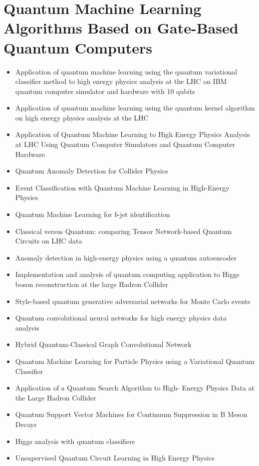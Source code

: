 \section{Quantum Machine Learning Algorithms Based on Gate-Based Quantum Computers}

\begin{itemize}
   \item Application of quantum machine learning using the quantum variational classifier method to high energy physics analysis at the LHC on IBM quantum computer simulator and hardware with 10 qubits~\cite{Wu:2020cye}
   \item Application of quantum machine learning using the quantum kernel algorithm on high energy physics analysis at the LHC~\cite{Wu:2021xsj}
   \item Application of Quantum Machine Learning to High Energy Physics Analysis at LHC Using Quantum Computer Simulators and Quantum Computer Hardware~\cite{Wu:2022tnc}
   \item Quantum Anomaly Detection for Collider Physics~\cite{Alvi:2022fkk}
   \item Event Classification with Quantum Machine Learning in High-Energy Physics~\cite{Terashi:2020wfi}
   \item Quantum Machine Learning for $b$-jet identification~\cite{Gianelle:2022unu}
   \item Classical versus Quantum: comparing Tensor Network-based Quantum Circuits on LHC data~\cite{Araz:2022haf}
   \item Anomaly detection in high-energy physics using a quantum autoencoder~\cite{Ngairangbam:2021yma}
   \item Implementation and analysis of quantum computing application to Higgs boson reconstruction at the large Hadron Collider~\cite{AlexiadesArmenakas:2021lrs}
   \item Style-based quantum generative adversarial networks for Monte Carlo events~\cite{Bravo-Prieto:2021ehz}
   \item Quantum convolutional neural networks for high energy physics data analysis~\cite{Chen:2020zkj}
   \item Hybrid Quantum-Classical Graph Convolutional Network~\cite{Chen:2021ouz}
   \item Quantum Machine Learning for Particle Physics using a Variational Quantum Classifier~\cite{Blance:2020nhl}
   \item Application of a Quantum Search Algorithm to High- Energy Physics Data at the Large Hadron Collider~\cite{Armenakas:2020ymp}
   \item Quantum Support Vector Machines for Continuum Suppression in B Meson Decays~\cite{Heredge:2021vww}
   \item Higgs analysis with quantum classifiers~\cite{Belis:2021zqi}
   \item Unsupervised Quantum Circuit Learning in High Energy Physics~\cite{Delgado:2022aty}
\end{itemize}


